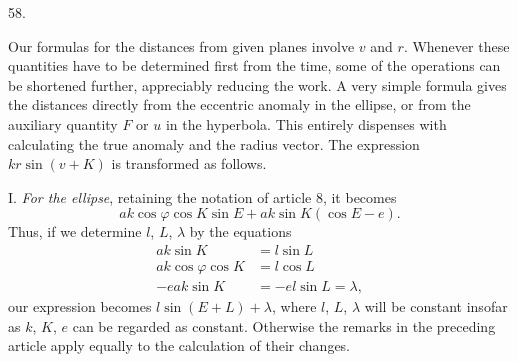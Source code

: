 \par{}\medskip
\hypertarget{native-076-article058}{}
\begin{center}58.\end{center}
Our formulas for the distances from given planes involve $v$ and $r$. Whenever these quantities have to be determined first from the time, some of the operations can be shortened further, appreciably reducing the work. A very simple formula gives the distances directly from the eccentric anomaly in the ellipse, or from the auxiliary quantity $F$ or $u$ in the hyperbola. This entirely dispenses with calculating the true anomaly and the radius vector. The expression $kr\sin(v+K)$ is transformed as follows.

I. \textit{For the ellipse}, retaining the notation of article 8, it becomes
\[
ak\cos\varphi\cos K\sin E+ak\sin K(\cos E-e).
\]
Thus, if we determine $l$, $L$, $\lambda$ by the equations
\[
\begin{aligned}
ak\sin K&=l\sin L\\
ak\cos\varphi\cos K&=l\cos L\\
-eak\sin K&=-el\sin L=\lambda,
\end{aligned}
\]
our expression becomes $l\sin(E+L)+\lambda$, where $l$, $L$, $\lambda$ will be constant insofar as $k$, $K$, $e$ can be regarded as constant. Otherwise the remarks in the preceding article apply equally to the calculation of their changes.

